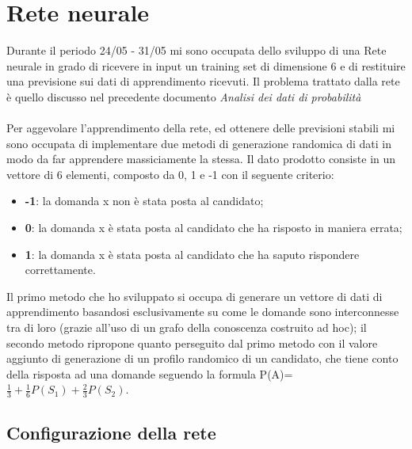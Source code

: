 \documentclass[10pt,a4paper]{article}
\begin{document}
\section{Rete neurale}
\label{Rete neurale}

Durante il periodo 24/05 - 31/05 mi sono occupata dello sviluppo di una Rete neurale in grado di ricevere in input un training set di dimensione 6 e di restituire una previsione sui dati di apprendimento ricevuti.
\noindent
Il problema trattato dalla rete \`e quello discusso nel precedente documento \textit{Analisi dei dati di probabilit\`a}
\\\\
Per aggevolare l'apprendimento della rete, ed ottenere delle previsioni stabili mi sono occupata di implementare due metodi di generazione randomica di dati in modo da far apprendere massiciamente la stessa.
Il dato prodotto consiste in un vettore di 6 elementi, composto da 0, 1 e -1 con il seguente criterio:
\begin{itemize}
\item \textbf{-1}: la domanda x non \`e stata posta al candidato;
\item \textbf{0}: la domanda x \`e stata posta al candidato che ha risposto in maniera errata;
\item \textbf{1}: la domanda x \`e stata posta al candidato che ha saputo rispondere correttamente.
\end{itemize}
\noindent
Il primo metodo che ho sviluppato si occupa di generare un vettore di dati di apprendimento basandosi esclusivamente su come le domande sono interconnesse tra di loro (grazie all'uso di un grafo della conoscenza costruito ad hoc); il secondo metodo ripropone quanto perseguito dal primo metodo con il valore aggiunto di generazione di un profilo randomico di un candidato, che tiene conto della risposta ad una domande seguendo la formula P(A)= $\frac{1}{3}+\frac{1}{6}P(S_1)+\frac{2}{3}P(S_2)$.

\subsection{Configurazione della rete}
\label{Configurazione della rete}
\end{document}
